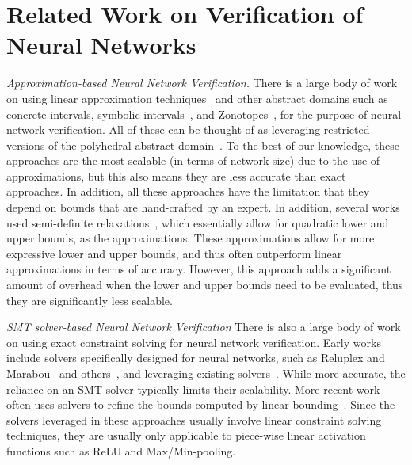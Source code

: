 \section{Related Work on Verification of Neural Networks}
\textit{Approximation-based Neural Network Verification.}
There is a large body of work on using linear approximation
techniques~\cite{SinghGPV19,zhang2018efficient,shi2020robustness,boopathy2019cnn,WengZCSHDBD18,paulsen2020reludiff,paulsen2020neurodiff,wu2021tightening,mohammadinejad2020diffrnn}
and other abstract domains such as concrete intervals, symbolic
intervals~\cite{WangPWYJ18}, and Zonotopes~\cite{GehrMDTCV18},
for the purpose of neural network verification.
%
All of these can be thought of as leveraging restricted versions of the
polyhedral abstract domain~\cite{CousotH78,CousotC77}.
%
To the best
of our knowledge, these approaches are the most scalable (in terms of network
size) due to the use of approximations, but this also means they are less
accurate than exact approaches. In addition, all these approaches have the
limitation that they depend on bounds that are hand-crafted by an expert.
%
In addition, several works used semi-definite
relaxations~\cite{dathathri2020enabling,hu2020reach}, which essentially allow for
quadratic lower and upper bounds, as the approximations. These approximations
allow for more expressive lower and upper bounds, and thus often outperform linear
approximations in terms of accuracy. However, this approach adds a significant
amount of overhead when the lower and upper bounds need to be evaluated, thus they
are significantly less scalable.

\textit{SMT solver-based Neural Network Verification}
There is also a large body of work on using exact constraint solving for neural
network verification. Early works include solvers specifically designed for
neural networks, such as Reluplex and
Marabou~\cite{KatzBDJK17,KatzHIJLLSTWZDK19} and others~\cite{DvijothamSGMK18},
and leveraging existing
solvers~\cite{Ehlers17,HuangKWW17,BastaniILVNC16,HuangKWW17,baluta2019quantitative,tjeng2019evaluating,hu2020reach}.
While more accurate, the reliance on an SMT solver typically limits their
scalability. More recent work
often uses solvers to refine the bounds computed by linear
bounding~\cite{Singh2019krelu,SinghGPV19iclr,WangPWYJ18nips,tran2019star,tran2020verification}.
Since the solvers leveraged in these approaches usually involve linear
constraint solving techniques, they are usually only applicable to piece-wise
linear activation functions such as ReLU and Max/Min-pooling.

